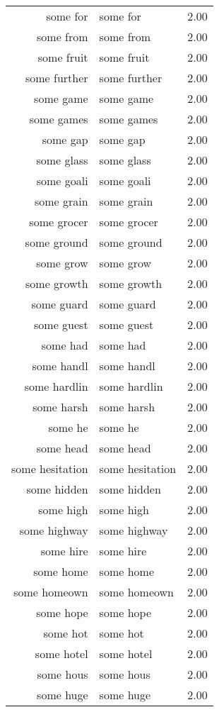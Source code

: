 \begin{table}[ht]
\begin{tabular}{rlr}
  some for & some for & 2.00 \\ 
  some from & some from & 2.00 \\ 
  some fruit & some fruit & 2.00 \\ 
  some further & some further & 2.00 \\ 
  some game & some game & 2.00 \\ 
  some games & some games & 2.00 \\ 
  some gap & some gap & 2.00 \\ 
  some glass & some glass & 2.00 \\ 
  some goali & some goali & 2.00 \\ 
  some grain & some grain & 2.00 \\ 
  some grocer & some grocer & 2.00 \\ 
  some ground & some ground & 2.00 \\ 
  some grow & some grow & 2.00 \\ 
  some growth & some growth & 2.00 \\ 
  some guard & some guard & 2.00 \\ 
  some guest & some guest & 2.00 \\ 
  some had & some had & 2.00 \\ 
  some handl & some handl & 2.00 \\ 
  some hardlin & some hardlin & 2.00 \\ 
  some harsh & some harsh & 2.00 \\ 
  some he & some he & 2.00 \\ 
  some head & some head & 2.00 \\ 
  some hesitation & some hesitation & 2.00 \\ 
  some hidden & some hidden & 2.00 \\ 
  some high & some high & 2.00 \\ 
  some highway & some highway & 2.00 \\ 
  some hire & some hire & 2.00 \\ 
  some home & some home & 2.00 \\ 
  some homeown & some homeown & 2.00 \\ 
  some hope & some hope & 2.00 \\ 
  some hot & some hot & 2.00 \\ 
  some hotel & some hotel & 2.00 \\ 
  some hous & some hous & 2.00 \\ 
  some huge & some huge & 2.00 \\ 

\end{tabular}
\end{table}
